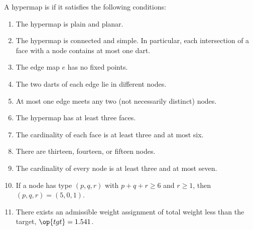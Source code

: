 \begin{definition}[tame]\label{definition:tame}
A hypermap is  if it satisfies the following conditions:
%
%
\begin{enumerate}\wasitemize 
\item {}  
The hypermap is plain and planar.
\item {} 
The hypermap is connected and simple.  In
  particular, each intersection of a face with a node contains at
  most one dart.
\item {} 
The edge map $e$ has no fixed points.
\item {} 
The two darts of each edge lie in different nodes.
\item {} 
At most one edge meets any two (not necessarily distinct) nodes.
\item {} 
  The hypermap has at least three faces.
\item {}
The cardinality of each face is at least three  and at most six.
\item {} 
There are  thirteen, fourteen, or fifteen nodes.
\item {} 
The cardinality of every node is at least three
  and at most seven.
\item {} 
If a node has type $(p,q,r)$ with $p+q+r\ge 6$ and $r\ge 1$, then $(p,q,r)=(5,0,1)$. 
\item {} 
There exists an admissible weight assignment
of total weight less than the target, $\op{tgt}=1.541$.
\end{enumerate}\wasitemize 
\end{definition}
%
%
%
%
%
%
%
%

